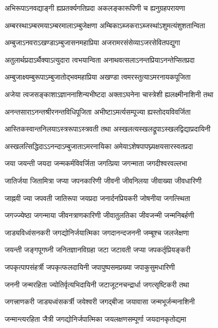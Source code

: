 \twolineshloka
{अभिरूपाऽनवद्याङ्गी ह्यप्रतर्क्यगतिप्रदा}
{अकलङ्कारूपिणी च ह्यनुग्रहपरायणा}%

\twolineshloka
{अम्बरस्थाऽम्बरमयाऽम्बरमालाऽम्बुजेक्षणा}
{अम्बिकाऽब्जकराऽब्जस्थांऽशुमत्यंशुशतान्विता}%

\twolineshloka
{अम्बुजाऽनवराऽखण्डाऽम्बुजासनमहाप्रिया}
{अजरामरसंसेव्याऽजरसेवितपद्युगा}%

\twolineshloka
{अतुलार्थप्रदाऽर्थैक्याऽत्युदारा त्वभयान्विता}
{अनाथवत्सलाऽनन्तप्रियाऽनन्तेप्सितप्रदा}%

\twolineshloka
{अम्बुजाक्ष्यम्बुरूपाऽम्बुजातोद्भवमहाप्रिया}
{अखण्डा त्वमरस्तुत्याऽमरनायकपूजिता}%

\twolineshloka
{अजेया त्वजसङ्काशाऽज्ञाननाशिन्यभीष्टदा}
{अक्ताऽघनेना चास्त्रेशी ह्यलक्ष्मीनाशिनी तथा}%

\twolineshloka
{अनन्तसाराऽनन्तश्रीरनन्तविधिपूजिता}
{अभीष्टाऽमर्त्यसम्पूज्या ह्यस्तोदयविवर्जिता}%

\twolineshloka
{आस्तिकस्वान्तनिलयाऽस्त्ररूपाऽस्त्रवती तथा}
{अस्खलत्यस्खलद्रूपाऽस्खलद्विद्याप्रदायिनी}%

\twolineshloka
{अस्खलत्सिद्धिदाऽऽनन्दाऽम्बुजाताऽमरनायिका}
{अमेयाऽशेषपापघ्न्यक्षयसारस्वतप्रदा}%

\twolineshloka
{जया जयन्ती जयदा जन्मकर्मविवर्जिता}
{जगत्प्रिया जगन्माता जगदीश्वरवल्लभा}%

\twolineshloka
{जातिर्जया जितामित्रा जप्या जपनकारिणी}
{जीवनी जीवनिलया जीवाख्या जीवधारिणी}%

\twolineshloka
{जाह्नवी ज्या जपवती जातिरूपा जयप्रदा}
{जनार्दनप्रियकरी जोषनीया जगत्स्थिता}%

\twolineshloka
{जगज्ज्येष्ठा जगन्माया जीवनत्राणकारिणी}
{जीवातुलतिका जीवजन्मी जन्मनिबर्हणी}%

\twolineshloka
{जाड्यविध्वंसनकरी जगद्योनिर्जयात्मिका}
{जगदानन्दजननी जम्बूश्च जलजेक्षणा}%

\twolineshloka
{जयन्ती जङ्गपूगघ्नी जनितज्ञानविग्रहा}
{जटा जटावती जप्या जपकर्तृप्रियङ्करी}%

\twolineshloka
{जपकृत्पापसंहर्त्री जपकृत्फलदायिनी}
{जपापुष्पसमप्रख्या जपाकुसुमधारिणी}%

\twolineshloka
{जननी जन्मरहिता ज्योतिर्वृत्यभिदायिनी}
{जटाजूटनचन्द्रार्धा जगत्सृष्टिकरी तथा}%

\twolineshloka
{जगत्त्राणकरी जाड्यध्वंसकर्त्री जयेश्वरी}
{जगद्बीजा जयावासा जन्मभूर्जन्मनाशिनी}%

\twolineshloka
{जन्मान्त्यरहिता जैत्री जगद्योनिर्जपात्मिका}
{जयलक्षणसम्पूर्णा जयदानकृतोद्यमा}%


